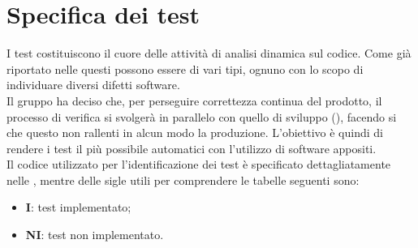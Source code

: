 \section{Specifica dei test}
I test costituiscono il cuore delle attività di analisi dinamica sul codice. Come già riportato nelle  questi possono essere di vari tipi, ognuno con lo scopo di individuare diversi difetti software. \\
Il gruppo \Gruppo{} ha deciso che, per perseguire correttezza continua del prodotto, il processo di verifica si svolgerà in parallelo con quello di sviluppo (), facendo si che questo non rallenti in alcun modo la produzione. L'obiettivo è quindi di rendere i test il più possibile automatici con l'utilizzo di software appositi. \\
Il codice utilizzato per l'identificazione dei test è specificato dettagliatamente nelle , mentre delle sigle utili per comprendere le tabelle seguenti sono:
\begin{itemize}
	\item \textbf{I}: test implementato;
	\item \textbf{NI}: test non implementato.
\end{itemize} 






